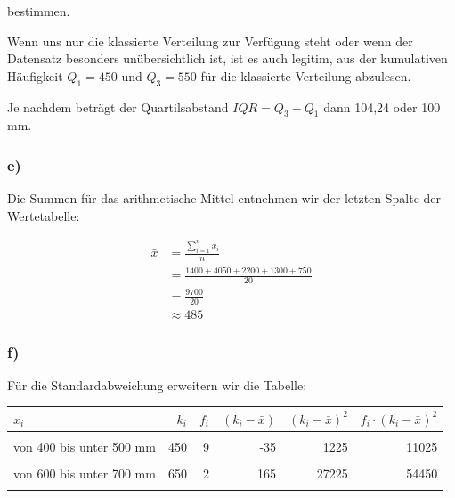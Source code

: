 \documentclass[
  11pt,
  ngerman,
  a4paper,
]{report}
\begin{document}
bestimmen.

Wenn uns nur die klassierte Verteilung zur Verfügung steht oder wenn der Datensatz besonders unübersichtlich ist, ist es auch legitim, aus der kumulativen Häufigkeit \(Q_1=450\) und \(Q_3=550\) für die klassierte Verteilung abzulesen.

Je nachdem beträgt der Quartilsabstand \(\mathit{IQR}=Q_3-Q_1\) dann 104,24 oder 100 mm.

\hypertarget{e}{%
\subsubsection{e)}\label{e}}

Die Summen für das arithmetische Mittel entnehmen wir der letzten Spalte der Wertetabelle:

\[\begin{aligned}
  \bar{x}&=\frac{\sum\limits_{i=1}^nx_i}{n} \\
         &=\frac{1400+4050+2200+1300+750}{20} \\
         &=\frac{9700}{20} \\
         &\approx485
\end{aligned}\]

\hypertarget{f}{%
\subsubsection{f)}\label{f}}

Für die Standardabweichung erweitern wir die Tabelle:

\begin{table}[H]
\centering
\begin{tabular}{>{\raggedright\arraybackslash}p{8cm}rrrrr}
\toprule
\textbf{$x_i$} & \textbf{$k_i$} & \textbf{$f_i$} & \textbf{$(k_i - \bar{x})$} & \textbf{$(k_i - \bar{x})^2$} & \textbf{$f_i \cdot (k_i - \bar{x})^2$}\\
\midrule
\cellcolor{gray!6}{von 300 bis unter 400 mm} & \cellcolor{gray!6}{350} & \cellcolor{gray!6}{4} & \cellcolor{gray!6}{-135} & \cellcolor{gray!6}{18225} & \cellcolor{gray!6}{72900}\\
von 400 bis unter 500 mm & 450 & 9 & -35 & 1225 & 11025\\
\cellcolor{gray!6}{von 500 bis unter 600 mm} & \cellcolor{gray!6}{550} & \cellcolor{gray!6}{4} & \cellcolor{gray!6}{65} & \cellcolor{gray!6}{4225} & \cellcolor{gray!6}{16900}\\
von 600 bis unter 700 mm & 650 & 2 & 165 & 27225 & 54450\\
\cellcolor{gray!6}{von 700 bis unter 800 mm} & \cellcolor{gray!6}{750} & \cellcolor{gray!6}{1} & \cellcolor{gray!6}{265} & \cellcolor{gray!6}{70225} & \cellcolor{gray!6}{70225}\\
\bottomrule
\end{tabular}
\end{table}
\end{document}
